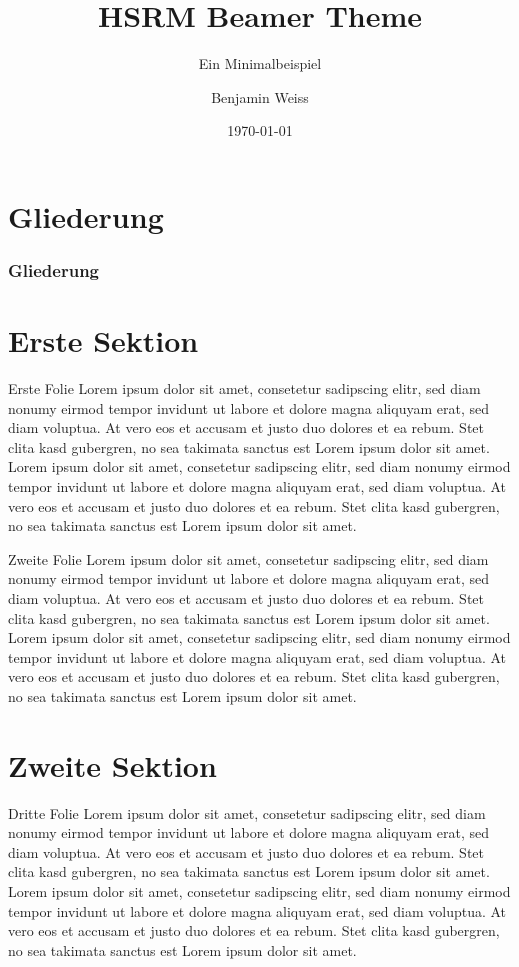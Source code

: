 \documentclass{beamer}
\title{HSRM Beamer Theme}
\subtitle{Ein Minimalbeispiel}
\author{Benjamin Weiss}
\institute{Studienbereich Informations- und Elektrotechnik\\Hochschule {\Medium RheinMain}}
\date{\today}
\begin{document}
\maketitle

\section*{Gliederung}
\begin{frame}
	\frametitle{Gliederung}
	\tableofcontents[hideallsubsections]
\end{frame}

\section{Erste Sektion}

\begin{frame}{Erste Folie}
	Lorem ipsum dolor sit amet, consetetur sadipscing elitr, sed diam nonumy eirmod tempor invidunt ut labore et dolore magna aliquyam erat, sed diam voluptua. At vero eos et accusam et justo duo dolores et ea rebum. Stet clita kasd gubergren, no sea takimata sanctus est Lorem ipsum dolor sit amet. Lorem  ipsum dolor sit amet, consetetur sadipscing elitr, sed diam nonumy eirmod tempor invidunt ut labore et dolore magna aliquyam erat, sed diam voluptua. At vero eos et accusam et justo duo dolores et ea rebum. Stet clita kasd gubergren, no sea takimata sanctus est Lorem ipsum dolor sit amet.
\end{frame}

\begin{frame}{Zweite Folie}
	Lorem ipsum dolor sit amet, consetetur sadipscing elitr, sed diam nonumy eirmod tempor invidunt ut labore et dolore magna aliquyam erat, sed diam voluptua. At vero eos et accusam et justo duo dolores et ea rebum. Stet clita kasd gubergren, no sea takimata sanctus est Lorem ipsum dolor sit amet. Lorem  ipsum dolor sit amet, consetetur sadipscing elitr, sed diam nonumy eirmod tempor invidunt ut labore et dolore magna aliquyam erat, sed diam voluptua. At vero eos et accusam et justo duo dolores et ea rebum. Stet clita kasd gubergren, no sea takimata sanctus est Lorem ipsum dolor sit amet.
\end{frame}

\section{Zweite Sektion}
\begin{frame}{Dritte Folie}
	Lorem ipsum dolor sit amet, consetetur sadipscing elitr, sed diam nonumy eirmod tempor invidunt ut labore et dolore magna aliquyam erat, sed diam voluptua. At vero eos et accusam et justo duo dolores et ea rebum. Stet clita kasd gubergren, no sea takimata sanctus est Lorem ipsum dolor sit amet. Lorem  ipsum dolor sit amet, consetetur sadipscing elitr, sed diam nonumy eirmod tempor invidunt ut labore et dolore magna aliquyam erat, sed diam voluptua. At vero eos et accusam et justo duo dolores et ea rebum. Stet clita kasd gubergren, no sea takimata sanctus est Lorem ipsum dolor sit amet.
\end{frame}
\end{document}
